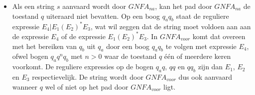 \begin{enumalgo}
\begin{itemize}
  \item Als een string $s$ aanvaard wordt door $GNFA_{na}$, kan het pad door $GNFA_{na}$ de toestand $q$ uiteraard niet bevatten. Op een boog $q_aq_b$ staat de reguliere expressie $E_4|E_1(E_2)^*E_3$, wat wil zeggen dat de string moet voldoen aan aan de expressie $E_4$ of de expressie $E_1(E_2)^*E_3$. In $GNFA_{voor}$ komt dat overeen met het bereiken van $q_b$ uit $q_a$ door een boog $q_aq_b$ te volgen met expressie $E_4$, ofwel bogen $q_aq^nq_b$ met $n > 0$ waar de toestand $q$ \'e\'en of meerdere keren voorkomt. De reguliere expressies op de bogen $q_aq$, $qq$ en $qq_b$ zijn dan $E_1$, $E_2$ en $E_3$ respectievelijk. De string wordt door $GNFA_{voor}$ dus ook aanvaard wanneer $q$ wel of niet op het pad door $GNFA_{voor}$ ligt.
  \end{itemize}
  \end{enumalgo}